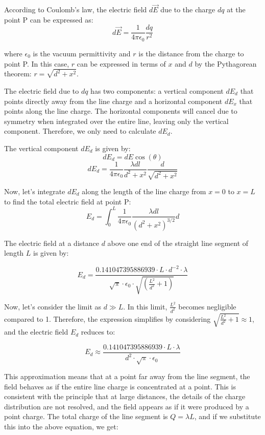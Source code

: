 \documentclass[a4paper,11pt]{article}
\begin{document}
According to Coulomb's law, the electric field \( d\vec{E} \) due to the charge \( dq \) at the point P can be expressed as:
\[ d\vec{E} = \frac{1}{4\pi\epsilon_0} \frac{dq}{r^2} \]

where \( \epsilon_0 \) is the vacuum permittivity and \( r \) is the distance from the charge to point P. In this case, \( r \) can be expressed in terms of \( x \) and \( d \) by the Pythagorean theorem: \( r = \sqrt{d^2 + x^2} \).

The electric field due to \( dq \) has two components: a vertical component \( dE_d \) that points directly away from the line charge and a horizontal component \( dE_x \) that points along the line charge. The horizontal components will cancel due to symmetry when integrated over the entire line, leaving only the vertical component. Therefore, we only need to calculate \( dE_d \).

The vertical component \( dE_d \) is given by:
\[ dE_d = dE \cos(\theta) \]
\[ dE_d = \frac{1}{4\pi\epsilon_0} \frac{\lambda dl}{d^2 + x^2} \frac{d}{\sqrt{d^2 + x^2}} \]

Now, let's integrate \( dE_d \) along the length of the line charge from \( x = 0 \) to \( x = L \) to find the total electric field at point P:
\[ E_d = \int_{0}^{L} \frac{1}{4\pi\epsilon_0} \frac{\lambda dl}{(d^2 + x^2)^{3/2}} d \]

The electric field at a distance \( d \) above one end of the straight line segment of length \( L \) is given by:

\[ E_d = \frac{0.141047395886939 \cdot L \cdot d^{-2} \cdot \lambda}{\sqrt{\pi} \cdot \epsilon_0 \cdot \sqrt{\left(\frac{L^2}{d^2} + 1\right)}} \]

Now, let's consider the limit as \( d \gg L \). In this limit, \( \frac{L^2}{d^2} \) becomes negligible compared to 1. Therefore, the expression simplifies by considering \( \sqrt{\frac{L^2}{d^2} + 1} \approx 1 \), and the electric field \( E_d \) reduces to:

\[ E_d \approx \frac{0.141047395886939 \cdot L \cdot \lambda}{d^2 \cdot \sqrt{\pi} \cdot \epsilon_0} \]

This approximation means that at a point far away from the line segment, the field behaves as if the entire line charge is concentrated at a point. This is consistent with the principle that at large distances, the details of the charge distribution are not resolved, and the field appears as if it were produced by a point charge. The total charge of the line segment is \( Q = \lambda L \), and if we substitute this into the above equation, we get:
\end{document}
